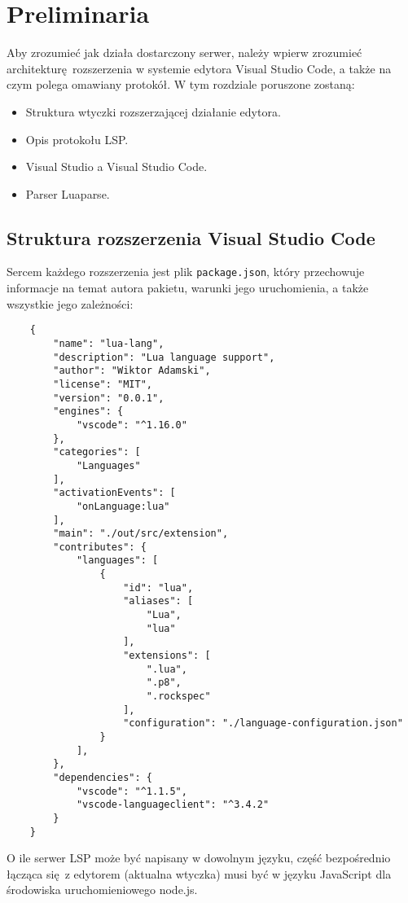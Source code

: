 \chapter{Preliminaria}
Aby zrozumieć jak działa dostarczony serwer, należy wpierw zrozumieć architekturę rozszerzenia w systemie edytora Visual Studio Code, a także na czym polega omawiany protokół. W tym rozdziale poruszone zostaną:

\begin{itemize}
    \item Struktura wtyczki rozszerzającej działanie edytora.
    \item Opis protokołu LSP.
    \item Visual Studio a Visual Studio Code.
    \item Parser Luaparse.
\end{itemize}

\section{Struktura rozszerzenia Visual Studio Code}
Sercem każdego rozszerzenia jest plik \texttt{package.json}, który przechowuje informacje na temat autora pakietu, warunki jego uruchomienia, a także wszystkie jego zależności:

\begin{lstlisting}
    {
        "name": "lua-lang",
        "description": "Lua language support",
        "author": "Wiktor Adamski",
        "license": "MIT",
        "version": "0.0.1",
        "engines": {
            "vscode": "^1.16.0"
        },
        "categories": [
            "Languages"
        ],
        "activationEvents": [
            "onLanguage:lua"
        ],
        "main": "./out/src/extension",
        "contributes": {
            "languages": [
                {
                    "id": "lua",
                    "aliases": [
                        "Lua",
                        "lua"
                    ],
                    "extensions": [
                        ".lua",
                        ".p8",
                        ".rockspec"
                    ],
                    "configuration": "./language-configuration.json"
                }
            ],
        },
        "dependencies": {
            "vscode": "^1.1.5",
            "vscode-languageclient": "^3.4.2"
        }
    }
\end{lstlisting}

O ile serwer LSP może być napisany w dowolnym języku, część bezpośrednio łącząca się z edytorem (aktualna wtyczka) musi być w języku JavaScript dla środowiska uruchomieniowego node.js. 

